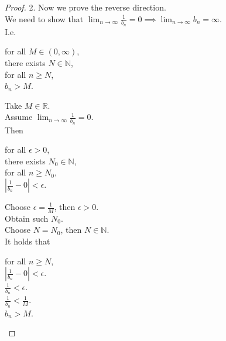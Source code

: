 \documentclass{article}
\newcommand{\N}{\mathbb{N}}
\newcommand{\R}{\mathbb{R}}
\newcommand{\e}{\epsilon}
\theoremstyle{mytheoremstyle}
\theoremstyle{mytheoremstyle}
\theoremstyle{myproblemstyle}
\begin{document}
\begin{proof}
        2. Now we prove the reverse direction. \\
        We need to show that $\lim_{n\to\infty}\frac{1}{b_n} = 0 \implies \lim_{n\to\infty}b_n = \infty$. \\
        I.e.
        \begin{center}
            \parbox{\linewidth}{
                \linewidth
                for all $M \in (0,\infty)$, \\
                \hspace*{1em} there exists $N \in \N$, \\
                \hspace*{2em} for all $n \geq N$, \\
                \hspace*{3em} $b_n > M$.
            }
        \end{center}
        Take $M \in \R$. \\
        Assume $\lim_{n\to\infty}\frac{1}{b_n} = 0$. \\
        Then
        \begin{center}
            \parbox{\linewidth}{
                \linewidth
                for all $\e > 0$, \\
                \hspace*{1em} there exists $N_0 \in \N$, \\
                \hspace*{2em} for all $n \geq N_0$, \\
                \hspace*{3em} $|\frac{1}{b_n} - 0| < \e$.
            }
        \end{center}
        Choose $\e = \frac{1}{M}$, then $\e > 0$. \\
        Obtain such $N_0$. \\
        Choose $N = N_0$, then $N \in \N$. \\
        It holds that
        \begin{center}
            \parbox{\linewidth}{
                \linewidth
                \hspace*{1em} for all $n \geq N$, \\
                \hspace*{2em} $|\frac{1}{b_n} - 0| < \e$. \\
                \hspace*{3em} $\frac{1}{b_n} < \e$. \\
                \hspace*{4em} $\frac{1}{b_n} < \frac{1}{M}$. \\
                \hspace*{5em} $b_n > M$.
            }
        \end{center}
    \end{proof}
\end{document}
